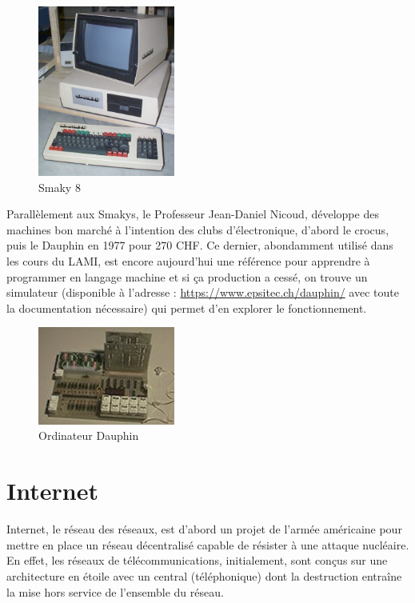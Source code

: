 \documentclass[a4paper,11pt]{book}
\begin{document}
\begin{figure}[h]
    \centering
    \includegraphics[width=0.4\textwidth]{media/machines/smaky8_bolo.jpeg}
    \caption{Smaky 8}
    \label{smaky8}
\end{figure}

Parallèlement aux Smakys, le Professeur Jean-Daniel Nicoud, développe des machines bon marché à l'intention des clubs d'électronique, d'abord le crocus, puis le Dauphin en 1977 pour 270 CHF. Ce dernier, abondamment utilisé dans les cours du LAMI, est encore aujourd'hui une référence pour apprendre à programmer en langage machine et si ça production a cessé, on trouve un simulateur (disponible à l'adresse : \url{https://www.epsitec.ch/dauphin/} avec toute la documentation nécessaire) qui permet d'en explorer le fonctionnement.

\begin{figure}[h]
    \centering
    \includegraphics[width=0.4\textwidth]{media/machines/DauphinEcouteur.jpeg}
    \caption{Ordinateur Dauphin}
    \label{dauphin}
\end{figure}


\section{Internet}

Internet, le réseau des réseaux, est d'abord un projet de l'armée américaine pour mettre en place un réseau décentralisé capable de résister à une attaque nucléaire. En effet, les réseaux de télécommunications, initialement, sont conçus sur une architecture en étoile avec un central (téléphonique) dont la destruction entraîne la mise hors service de l'ensemble du réseau. 
\end{document}
